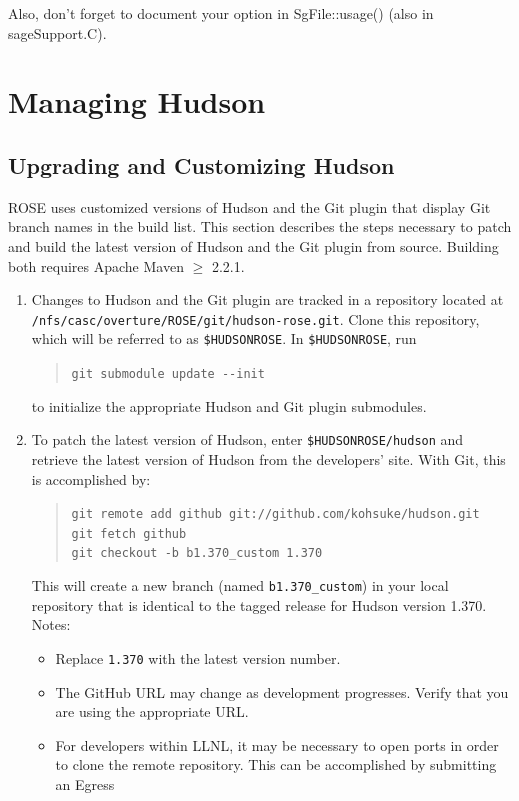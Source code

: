 Also, don't forget to document your option in SgFile::usage() (also in sageSupport.C).


\section{Managing Hudson}
\subsection{Upgrading and Customizing Hudson}
ROSE uses customized versions of Hudson and the Git plugin that display Git branch names
in the build list. This section describes the steps necessary to patch
and build the latest version of Hudson and the Git plugin from source.
Building both requires Apache Maven $\geq$ 2.2.1. 

\begin{enumerate}
\item{
Changes to Hudson and the Git plugin are tracked in a repository located
at \texttt{/nfs/casc/overture/ROSE/git/hudson-rose.git}. Clone
this repository, which will be referred to as \texttt{\$HUDSONROSE}. In
\texttt{\$HUDSONROSE}, run 
\begin{quote}
\texttt{git submodule update -{}-init}
\end{quote}
to initialize the appropriate Hudson and Git plugin submodules.  
}
\item{
To patch the latest version of Hudson, enter \texttt{\$HUDSONROSE/hudson}
and retrieve the latest version of Hudson from the developers' site. With Git,
this is accomplished by:
  \begin{quote}
  \texttt{git remote add github git://github.com/kohsuke/hudson.git \\
    git fetch github \\
    git checkout -b b1.370\_custom 1.370
  }
  \end{quote}
This will create a new branch (named \texttt{b1.370\_custom}) in your
local repository that is identical to the tagged release for Hudson
version 1.370. Notes: 
  \begin{itemize}
  \item{Replace \texttt{1.370} with the latest version number.}
  \item{The GitHub URL may change as development progresses.
Verify that you are using the appropriate URL.}
  \item{For developers within LLNL, it may be necessary to open ports in order to
clone the remote repository. This can be accomplished by submitting an Egress 
}
\end{itemize}}
\end{enumerate}
